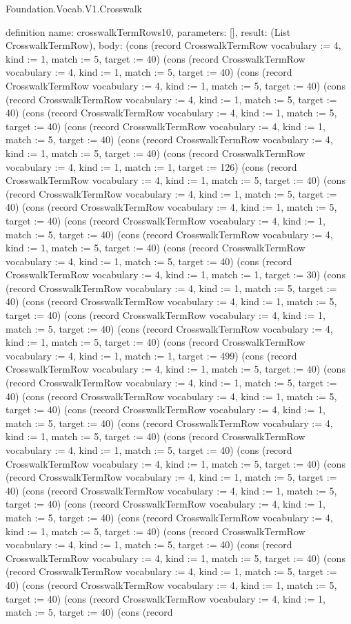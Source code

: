 \begin{lexlean}{Foundation.Vocab.V1.Crosswalk}
\begin{semanticmodule}
definition{
  name: crosswalkTermRows10,
  parameters: [],
  result: (List CrosswalkTermRow),
  body: (cons (record CrosswalkTermRow {vocabulary := 4, kind := 1, match := 5, target := 40}) (cons (record CrosswalkTermRow {vocabulary := 4, kind := 1, match := 5, target := 40}) (cons (record CrosswalkTermRow {vocabulary := 4, kind := 1, match := 5, target := 40}) (cons (record CrosswalkTermRow {vocabulary := 4, kind := 1, match := 5, target := 40}) (cons (record CrosswalkTermRow {vocabulary := 4, kind := 1, match := 5, target := 40}) (cons (record CrosswalkTermRow {vocabulary := 4, kind := 1, match := 5, target := 40}) (cons (record CrosswalkTermRow {vocabulary := 4, kind := 1, match := 5, target := 40}) (cons (record CrosswalkTermRow {vocabulary := 4, kind := 1, match := 1, target := 126}) (cons (record CrosswalkTermRow {vocabulary := 4, kind := 1, match := 5, target := 40}) (cons (record CrosswalkTermRow {vocabulary := 4, kind := 1, match := 5, target := 40}) (cons (record CrosswalkTermRow {vocabulary := 4, kind := 1, match := 5, target := 40}) (cons (record CrosswalkTermRow {vocabulary := 4, kind := 1, match := 5, target := 40}) (cons (record CrosswalkTermRow {vocabulary := 4, kind := 1, match := 5, target := 40}) (cons (record CrosswalkTermRow {vocabulary := 4, kind := 1, match := 5, target := 40}) (cons (record CrosswalkTermRow {vocabulary := 4, kind := 1, match := 1, target := 30}) (cons (record CrosswalkTermRow {vocabulary := 4, kind := 1, match := 5, target := 40}) (cons (record CrosswalkTermRow {vocabulary := 4, kind := 1, match := 5, target := 40}) (cons (record CrosswalkTermRow {vocabulary := 4, kind := 1, match := 5, target := 40}) (cons (record CrosswalkTermRow {vocabulary := 4, kind := 1, match := 5, target := 40}) (cons (record CrosswalkTermRow {vocabulary := 4, kind := 1, match := 1, target := 499}) (cons (record CrosswalkTermRow {vocabulary := 4, kind := 1, match := 5, target := 40}) (cons (record CrosswalkTermRow {vocabulary := 4, kind := 1, match := 5, target := 40}) (cons (record CrosswalkTermRow {vocabulary := 4, kind := 1, match := 5, target := 40}) (cons (record CrosswalkTermRow {vocabulary := 4, kind := 1, match := 5, target := 40}) (cons (record CrosswalkTermRow {vocabulary := 4, kind := 1, match := 5, target := 40}) (cons (record CrosswalkTermRow {vocabulary := 4, kind := 1, match := 5, target := 40}) (cons (record CrosswalkTermRow {vocabulary := 4, kind := 1, match := 5, target := 40}) (cons (record CrosswalkTermRow {vocabulary := 4, kind := 1, match := 5, target := 40}) (cons (record CrosswalkTermRow {vocabulary := 4, kind := 1, match := 5, target := 40}) (cons (record CrosswalkTermRow {vocabulary := 4, kind := 1, match := 5, target := 40}) (cons (record CrosswalkTermRow {vocabulary := 4, kind := 1, match := 5, target := 40}) (cons (record CrosswalkTermRow {vocabulary := 4, kind := 1, match := 5, target := 40}) (cons (record CrosswalkTermRow {vocabulary := 4, kind := 1, match := 5, target := 40}) (cons (record CrosswalkTermRow {vocabulary := 4, kind := 1, match := 5, target := 40}) (cons (record CrosswalkTermRow {vocabulary := 4, kind := 1, match := 5, target := 40}) (cons (record CrosswalkTermRow {vocabulary := 4, kind := 1, match := 5, target := 40}) (cons (record }
\end{semanticmodule}
\end{lexlean}

